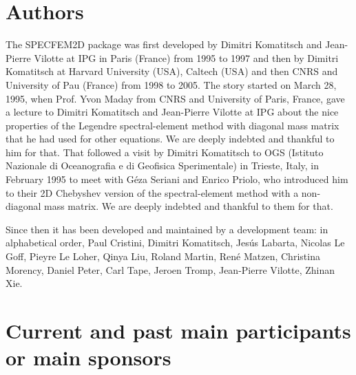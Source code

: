 \documentclass[oneside,english,onecolumn,letterpaper]{book}
\begin{document}
\section*{Authors}
The SPECFEM2D package was first developed by Dimitri Komatitsch and Jean-Pierre Vilotte at IPG in Paris (France) from 1995 to 1997
and then by Dimitri Komatitsch at Harvard University (USA), Caltech (USA) and then CNRS and University of Pau (France) from 1998 to 2005.
The story started on March 28, 1995, when Prof. Yvon Maday from CNRS and University of Paris, France, gave a lecture to
Dimitri Komatitsch and Jean-Pierre Vilotte at IPG about the nice properties of the Legendre spectral-element method with diagonal mass matrix that he had used for
other equations. We are deeply indebted and thankful to him for that.
That followed a visit by Dimitri Komatitsch to OGS (Istituto Nazionale di Oceanografia e di Geofisica Sperimentale) in Trieste, Italy, in February 1995
to meet with G\'eza Seriani and Enrico Priolo, who introduced him to their 2D Chebyshev version of the spectral-element method with a non-diagonal mass matrix.
We are deeply indebted and thankful to them for that.

Since then it has been developed and maintained by a development team: in alphabetical order,
Paul Cristini,
Dimitri Komatitsch,
Jes\'us Labarta,
Nicolas Le Goff,
Pieyre Le Loher,
Qinya Liu,
Roland Martin,
Ren\'e Matzen,
Christina Morency,
Daniel Peter,
Carl Tape,
Jeroen Tromp,
Jean-Pierre Vilotte,
Zhinan Xie.

\section*{Current and past main participants or main sponsors}
\end{document}
